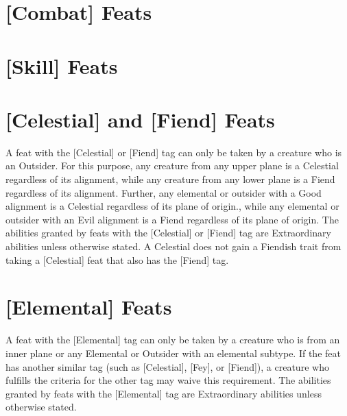 \section{[Combat] Feats} \label{feats:combat}

	\begin{multicols}{2}

	

	\end{multicols}

	\section{[Skill] Feats}

	\begin{multicols}{2}

	

	\end{multicols}

\section{[Celestial] and [Fiend] Feats} \label{feats:outsider}

A feat with the [Celestial] or [Fiend] tag can only be taken by a creature who is an Outsider. For this purpose, any creature from any upper plane is a Celestial regardless of its alignment, while any creature from any lower plane is a Fiend regardless of its alignment. Further, any elemental or outsider with a Good alignment is a Celestial regardless of its plane of origin., while any elemental or outsider with an Evil alignment is a Fiend regardless of its plane of origin. The abilities granted by feats with the [Celestial] or [Fiend] tag are Extraordinary abilities unless otherwise stated. A Celestial does not gain a Fiendish trait from taking a [Celestial] feat that also has the [Fiend] tag.

	\begin{multicols}{2}

	

	\end{multicols}

\section{[Elemental] Feats} \label{feats:elemental}

A feat with the [Elemental] tag can only be taken by a creature who is from an inner plane or any Elemental or Outsider with an elemental subtype. If the feat has another similar tag (such as [Celestial], [Fey], or [Fiend]), a creature who fulfills the criteria for the other tag may waive this requirement. The abilities granted by feats with the [Elemental] tag are Extraordinary abilities unless otherwise stated.

\begin{multicols}{2}

	

\end{multicols}